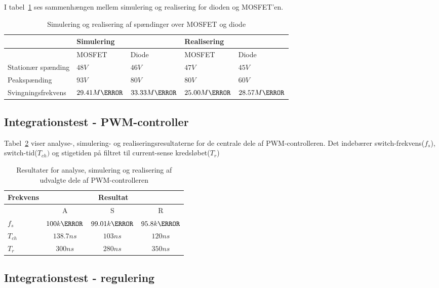 I tabel~\ref{tab:MOSDIODE} ses sammenhængen mellem simulering og realisering for dioden og MOSFET'en.
\begin{table}[H] 			
	\centering
	\begin{tabularx}{\textwidth}{|X|l|l|l|l|}
		\hline
		& \multicolumn{2}{|X|}{\textbf{Simulering}} & \multicolumn{2}{|X|}{\textbf{Realisering}} \\ \hline
		& MOSFET & Diode & MOSFET & Diode \\ \hline
		Stationær spænding & $48V$ & $46V$ & $47V$ & $45V$ \\ \hline
		Peakspænding & $93V$ & $80V$ & $80V$ & $60V$ \\ \hline
		Svingningsfrekvens & $29.41M\hertz$ & $33.33M\hertz$ & $25.00M\hertz$ & $28.57M\hertz$ \\ \hline
	\end{tabularx}
	\caption{Simulering og realisering af spændinger over MOSFET og diode}
	\label{tab:MOSDIODE}
\end{table}

\subsection{Integrationstest - PWM-controller}
Tabel~\ref{tab:resultat_PWM} viser analyse-, simulering- og realiseringsresultaterne for de centrale dele af PWM-controlleren. Det indebærer switch-frekvens($f_s$), switch-tid($T_{ch})$ og stigetiden på filtret til current-sense kredsløbet($T_r$)
\begin{table}[H] 			
	\centering
	\begin{tabularx}{\textwidth}{|X|c|c|c|}
		\hline
		\textbf{Frekvens} & \multicolumn{3}{|c|}{\textbf{Resultat}} 		\\ \hline
		& A & S & R 									\\ \hline 
		$f_s$ & $100k\hertz$ & $99.01k\hertz$ & $95.8k\hertz$ 									\\ \hline
		$T_{ch}$ & $138.7ns$ & $103ns$ & $120ns$ 									\\ \hline
		$T_r$ & $300ns$ & $280ns$ & $350ns$ 									\\ \hline
	\end{tabularx}
	\caption{Resultater for analyse, simulering og realisering af udvalgte dele af PWM-controlleren}
	\label{tab:resultat_PWM}
\end{table}

\subsection{Integrationstest - regulering}

